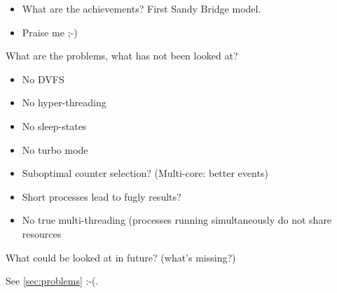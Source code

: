 
\begin{itemize}

\item What are the achievements? First Sandy Bridge model.

\item Praise me ;-)

\end{itemize}


\label{sec:problems}

What are the problems, what has not been looked at?

\begin{itemize}

\item No DVFS

\item No hyper-threading

\item No sleep-states

\item No turbo mode

\item Suboptimal counter selection? (Multi-core: better events)

\item Short processes lead to fugly results?

\item No true multi-threading (processes running simultaneously do not share
resources

\end{itemize}


\label{sec:outlook}

What could be looked at in future? (what's missing?)

See \ref{sec:problems} :-(.
